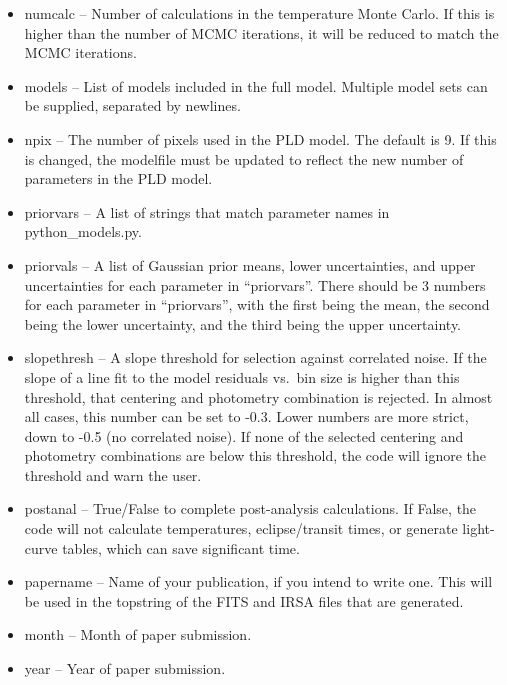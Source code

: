 \documentclass[letterpaper,12pt]{article}
\begin{document}
\begin{itemize}
\begin{itemize}
\item numcalc -- Number of calculations in the temperature Monte
  Carlo.  If this is higher than the number of MCMC iterations, it
  will be reduced to match the MCMC iterations.

\item models -- List of models included in the full model. Multiple
  model sets can be supplied, separated by newlines.

\item npix -- The number of pixels used in the PLD model. The default is
  9. If this is changed, the modelfile must be updated to reflect the
  new number of parameters in the PLD model.

\item priorvars -- A list of strings that match parameter names in
  python\_models.py.

\item priorvals -- A list of Gaussian prior means, lower uncertainties, and
  upper uncertainties for each parameter in ``priorvars''. There should
  be 3 numbers for each parameter in ``priorvars'', with the first being
  the mean, the second being the lower uncertainty, and the third
  being the upper uncertainty.

\item slopethresh -- A slope threshold for selection against correlated
  noise. If the slope of a line fit to the model residuals vs.\ bin size
  is higher than this threshold, that centering and photometry combination
  is rejected. In almost all cases, this number can be set to -0.3. Lower
  numbers are more strict, down to -0.5 (no correlated noise). If none
  of the selected centering and photometry combinations are below this
  threshold, the code will ignore the threshold and warn the user.

\item postanal -- True/False to complete post-analysis calculations.
  If False, the code will not calculate temperatures, eclipse/transit
  times, or generate light-curve tables, which can save significant
  time.

\item papername -- Name of your publication, if you intend to write
  one. This will be used in the topstring of the FITS and IRSA files
  that are generated.

\item month -- Month of paper submission.

\item year -- Year of paper submission.


\end{itemize}
\end{itemize}
\end{document}
